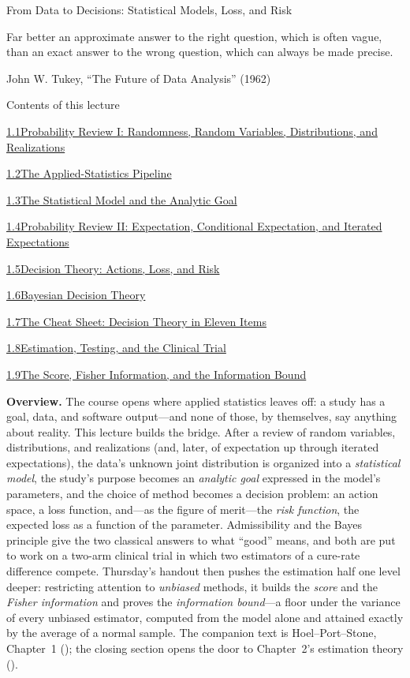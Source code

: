 \documentclass[main.tex]{subfiles}
\begin{document}
%
  {From Data to Decisions: Statistical Models, Loss, and Risk}

\epigraph{Far better an approximate answer to the right question, which is often vague, than an
exact answer to the wrong question, which can always be made precise.}%
{John W. Tukey, ``The Future of Data Analysis'' (1962)}

\begin{lecturecontents}{Contents of this lecture}
  \item \hyperlink{1.1}{1.1\quad Probability Review I: Randomness, Random Variables, Distributions, and Realizations}
  \item \hyperlink{1.2}{1.2\quad The Applied-Statistics Pipeline}
  \item \hyperlink{1.3}{1.3\quad The Statistical Model and the Analytic Goal}
  \item \hyperlink{1.4}{1.4\quad Probability Review II: Expectation, Conditional Expectation, and Iterated Expectations}
  \item \hyperlink{1.5}{1.5\quad Decision Theory: Actions, Loss, and Risk}
  \item \hyperlink{1.6}{1.6\quad Bayesian Decision Theory}
  \item \hyperlink{1.7}{1.7\quad The Cheat Sheet: Decision Theory in Eleven Items}
  \item \hyperlink{1.8}{1.8\quad Estimation, Testing, and the Clinical Trial}
  \item \hyperlink{1.9}{1.9\quad The Score, Fisher Information, and the Information Bound}
\end{lecturecontents}

\bigskip
\noindent\textbf{Overview.} The course opens where applied statistics leaves off: a study has a
goal, data, and software output---and none of those, by themselves, say anything about reality.
This lecture builds the bridge. After a review of random variables, distributions, and
realizations (and, later, of expectation up through iterated expectations), the data's unknown
joint distribution is organized into a \emph{statistical model}, the study's purpose becomes an
\emph{analytic goal} expressed in the model's parameters, and the choice of method becomes a
decision problem: an action space, a loss function, and---as the figure of merit---the
\emph{risk function}, the expected loss as a function of the parameter. Admissibility and the
Bayes principle give the two classical answers to what ``good'' means, and both are put to work
on a two-arm clinical trial in which two estimators of a cure-rate difference compete.
Thursday's handout then pushes the estimation half one level deeper: restricting attention to
\emph{unbiased} methods, it builds the \emph{score} and the \emph{Fisher information} and
proves the \emph{information bound}---a floor under the variance of every unbiased estimator,
computed from the model alone and attained exactly by the average of a normal sample. The
companion text is Hoel--Port--Stone, Chapter~1 (); the closing section opens the door
to Chapter~2's estimation theory ().
\end{document}
